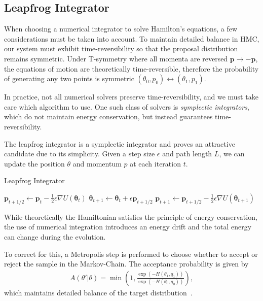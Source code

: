 \documentclass[11pt]{article}
\begin{document}
\subsection{Leapfrog Integrator}\label{subsec:integrator}
    When choosing a numerical integrator to solve Hamilton's equations, a few considerations must be taken into account.
    To maintain detailed balance in HMC, our system must exhibit time-reversibility so that the proposal distribution
    remains symmetric.
    Under T-symmetry where all momenta are reversed $\mathbf{p} \rightarrow -\mathbf{p}$, the equations of motion are
    theoretically time-reversible, therefore the probability of generating any two points is
    symmetric $(\theta_0, p_0) \leftrightarrow (\theta_1, p_1)$.

    In practice, not all numerical solvers preserve time-reversibility, and we must take care which algorithm to use.
    One such class of solvers is \emph{symplectic integrators}, which do not
    maintain energy conservation, but instead guarantees time-reversibility.

    The leapfrog integrator is a symplectic integrator and proves an attractive candidate due to its simplicity.
    Given a step size $\epsilon$ and path length $L$, we can update the position $\theta$ and momentum $p$ at each iteration $t$.
    \begin{algorithm}
    \caption{Leapfrog Integrator}
    \label{alg:leapfrog_integrator}
    \begin{algorithmic}
        \STATE {}
        \STATE $\mathbf{p}_{t+1/2} \gets \mathbf{p}_t - \frac{1}{2} \epsilon \nabla U(\mathbf{\theta}_t)$
        \STATE
        \STATE $ \mathbf{\theta}_{t+1} \gets \mathbf{\theta}_t + \epsilon \mathbf{p}_{t+1/2}$
        \STATE
        \STATE $ \mathbf{p}_{t+1} \gets \mathbf{p}_{t+1/2} - \frac{1}{2} \epsilon \nabla U(\mathbf{\theta}_{t+1})$
        \ENDFOR
    \end{algorithmic}
    \end{algorithm}

    While theoretically the Hamiltonian satisfies the principle of energy conservation, the use of numerical
    integration introduces an energy drift and the total energy can change during the evolution.

    To correct for this, a Metropolis step is performed to choose whether to accept or reject the sample in
    the Markov-Chain.
    The acceptance probability is given by
    \begin{equation}\label{eq:hmc_accept_prob}
    \begin{aligned}
        A(\theta' | \theta) = \min \left(1, \frac{\exp(-H(\theta_1, q_1)) }{\exp(-H(\theta_0, q_0)) } \right),
    \end{aligned}
    \end{equation}
    which maintains detailed balance of the target distribution~\cite{betancourt2018conceptual}.
\end{document}

